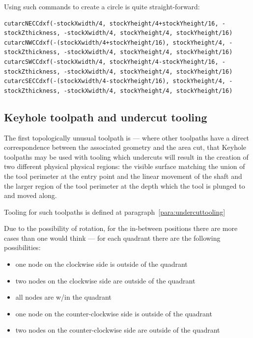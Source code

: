 \documentclass{ltxdoc}
\begin{document}
Using such commands to create a circle is quite straight-forward:

\begin{verbatim}
cutarcNECCdxf(-stockXwidth/4, stockYheight/4+stockYheight/16, -stockZthickness, -stockXwidth/4, stockYheight/4, stockYheight/16)
cutarcNWCCdxf(-(stockXwidth/4+stockYheight/16), stockYheight/4, -stockZthickness, -stockXwidth/4, stockYheight/4, stockYheight/16)
cutarcSWCCdxf(-stockXwidth/4, stockYheight/4-stockYheight/16, -stockZthickness, -stockXwidth/4, stockYheight/4, stockYheight/16)
cutarcSECCdxf(-(stockXwidth/4-stockYheight/16), stockYheight/4, -stockZthickness, -stockXwidth/4, stockYheight/4, stockYheight/16)
\end{verbatim}
 
\subsection{Keyhole toolpath and undercut tooling}
 
\label{subsec:keyholetoolpaths}
The first topologically unusual toolpath is  --- where other toolpaths have a direct correspondence between the associated geometry and the area cut, that Keyhole toolpaths may be used with tooling which undercuts will result in the creation of two different physical physical regions: the visible surface matching the union of the tool perimeter at the entry point and the linear movement of the shaft and the larger region of the tool perimeter at the depth which the tool is plunged to and moved along.
 
Tooling for such toolpaths is defined at paragraph~\ref{para:undercuttooling}

Due to the possibility of rotation, for the in-between positions there are more cases than one would think — for each quadrant there are the following possibilities:

\begin{itemize}
 \item one node on the clockwise side is outside of the quadrant
 \item two nodes on the clockwise side are outside of the quadrant
 \item all nodes are w/in the quadrant
 \item one node on the counter-clockwise side is outside of the quadrant
 \item two nodes on the counter-clockwise side are outside of the quadrant
\end{itemize}
 
\end{document}
